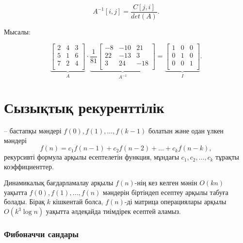 \[A^{-1}[i,j] = \frac{C[j,i]}{det(A)}.\]

Мысалы:

\[
\underbrace{
 \begin{bmatrix}
  2 & 4 & 3\\
  5 & 1 & 6\\
  7 & 2 & 4\\
 \end{bmatrix}
}_{A}
\cdot
\underbrace{
 \frac{1}{81}
 \begin{bmatrix}
   -8 & -10 & 21 \\
   22 & -13 & 3 \\
   3 & 24 & -18 \\
 \end{bmatrix}
}_{A^{-1}}
=
\underbrace{
 \begin{bmatrix}
  1 & 0 & 0 \\
  0 & 1 & 0 \\
  0 & 0 & 1 \\
 \end{bmatrix}
}_{I}.
\]

\section{Сызықтық рекуренттілік}


 -- 
бастапқы мәндері 
$f(0),f(1),\ldots,f(k-1)$ болатын
және одан үлкен мәндері 
\[f(n) = c_1 f(n-1) + c_2 f(n-2) + \ldots + c_k f (n-k),\]
рекурсивті формула 
арқылы есептелетін функция, мұндағы $c_1,c_2,\ldots,c_k$ тұрақты
коэффициенттер.


Динамикалық бағдарламалау арқылы $f(n)$-нің кез келген 
мәнін $O(kn)$ уақытта 
$f(0),f(1),\ldots,f(n)$ мәндерін біртіндеп есептеу арқылы
табуға болады. Бірақ $k$ кішкентай болса, $f(n)$-ді
матрица операциялары арқылы $O(k^3 \log n)$ 
уақытта әлдеқайда тиімдірек есептей аламыз. 

\subsubsection{Фибоначчи сандары}


